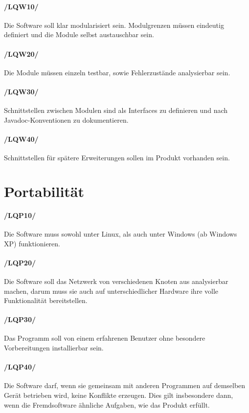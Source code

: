 \paragraph{/LQW10/} Die Software soll klar modularisiert sein. Modulgrenzen
müssen eindeutig definiert und die Module selbst austauschbar sein.

\paragraph{/LQW20/} Die Module müssen einzeln testbar, sowie Fehlerzustände
analysierbar sein.

\paragraph{/LQW30/} Schnittstellen zwischen Modulen sind als Interfaces zu
definieren und nach Javadoc-Konventionen zu dokumentieren.

\paragraph{/LQW40/} Schnittstellen für spätere Erweiterungen sollen im Produkt
vorhanden sein.

\section{Portabilität}

\paragraph{/LQP10/} Die Software muss sowohl unter Linux, als auch unter Windows
(ab Windows XP) funktionieren.

\paragraph{/LQP20/} Die Software soll das Netzwerk von verschiedenen Knoten aus
analysierbar machen, darum muss sie auch auf unterschiedlicher Hardware ihre
volle Funktionalität bereitstellen.

\paragraph{/LQP30/} Das Programm soll von einem erfahrenen Benutzer ohne
besondere Vorbereitungen installierbar sein.

\paragraph{/LQP40/} Die Software darf, wenn sie gemeinsam mit anderen Programmen
auf demselben Gerät betrieben wird, keine Konflikte erzeugen. Dies gilt
insbesondere dann, wenn die Fremdsoftware ähnliche Aufgaben, wie das Produkt
erfüllt.